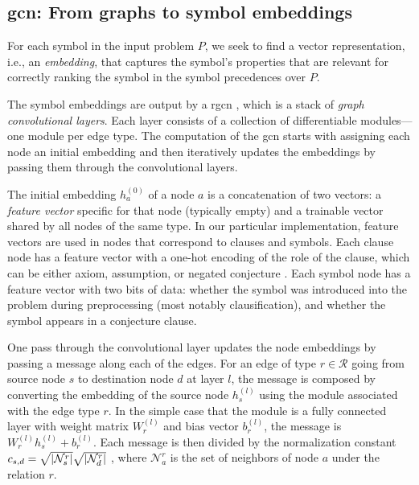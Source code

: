 \subsection{\Gls{gcn}: From graphs to symbol embeddings}
\label{sec:gcn}

For each symbol in the input problem $P$,
we seek to find a vector representation, i.e., an \emph{embedding},
that captures the symbol's properties that are relevant
for correctly ranking the symbol in the symbol precedences over $P$.

The symbol embeddings are output by a \gls{rgcn} \cite{Schlichtkrull2017},
which is a stack of \emph{graph convolutional layers}.
Each layer consists of a collection of differentiable modules---one module per edge type.
The computation of the \gls{gcn} starts with assigning each node an initial embedding
and then iteratively updates the embeddings by passing them through the convolutional layers.

The initial embedding $h_a^{(0)}$ of a node $a$ is a concatenation of two vectors:
a \emph{feature vector} specific for that node (typically empty)
and a trainable vector shared by all nodes of the same type.
In our particular implementation,
feature vectors are used in nodes that correspond to clauses and symbols.
Each clause node has a feature vector with a one-hot encoding of the role of the clause,
which can be either axiom, assumption, or negated conjecture \cite{TptpSyntax,Sutcliffe2017}.
Each symbol node has a feature vector with two bits of data:
whether the symbol was introduced into the problem during preprocessing (most notably clausification),
and whether the symbol appears in a conjecture clause.

One pass through the convolutional layer
updates the node embeddings by passing a message along each of the edges.
For an edge of type $r \in \mathcal{R}$ going from source node $s$ to destination node $d$ at layer $l$,
the message is composed by converting the embedding of the source node $h_s^{(l)}$
using the module associated with the edge type $r$.
In the simple case that the module is a fully connected layer with weight matrix $W_r^{(l)}$ and bias vector $b_r^{(l)}$,
the message is $W_r^{(l)} h_s^{(l)} + b_r^{(l)}$.
Each message is then divided by the normalization constant
$c_{s,d} = \sqrt{\left|\mathcal{N}_s^r\right|} \sqrt{\left|\mathcal{N}_d^r\right|}$ \cite{kipf2017semisupervised},
where $\mathcal{N}_a^r$ is the set of neighbors of node $a$ under the relation $r$.


